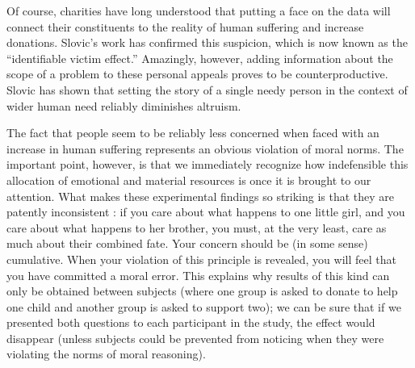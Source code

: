 \documentclass[a4paper,14pt]{extbook}
\begin{document}
Of course, charities have long understood that putting a face on the data will connect their constituents to the reality of human suffering and increase donations.
Slovic's work has confirmed this suspicion, which is now known as the ``identifiable victim effect.''
Amazingly, however, adding information about the scope of a problem to these personal appeals proves to be counterproductive.
Slovic has shown that setting the story of a single needy person in the context of wider human need reliably diminishes altruism.

The fact that people seem to be reliably less concerned when faced with an increase in human suffering represents an obvious violation of moral norms.
The important point, however, is that we immediately recognize how indefensible this allocation of emotional and material resources is once it is brought to our attention.
What makes these experimental findings so striking is that they are patently inconsistent :
if you care about what happens to one little girl, and you care about what happens to her brother, you must, at the very least, care as much about their combined fate.
Your concern should be (in some sense) cumulative.
When your violation of this principle is revealed, you will feel that you have committed a moral error.
This explains why results of this kind can only be obtained between subjects (where one group is asked to donate to help one child and another group is asked to support two);
we can be sure that if we presented both questions to each participant in the study, the effect would disappear (unless subjects could be prevented from noticing when they were violating the norms of moral reasoning).
\end{document}
